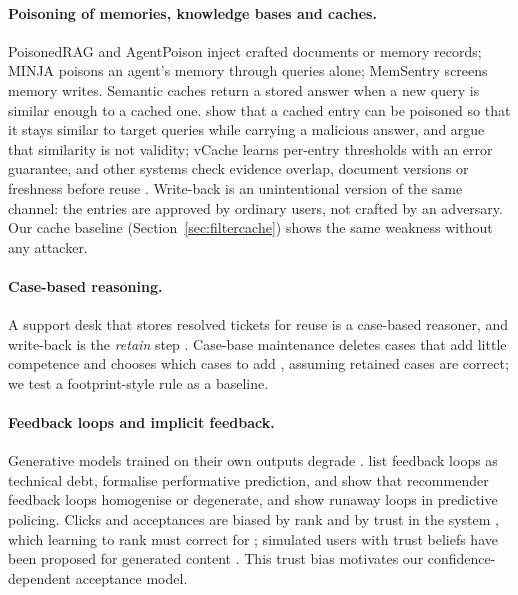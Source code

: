\documentclass[11pt]{article}
\begin{document}
\paragraph{Poisoning of memories, knowledge bases and caches.} PoisonedRAG \citep{zou2025poisonedrag} and AgentPoison \citep{chen2024agentpoison} inject crafted documents or memory records; MINJA \citep{dong2025minja} poisons an agent's memory through queries alone; MemSentry \citep{memsentry2026} screens memory writes. Semantic caches \citep{gptcache} return a stored answer when a new query is similar enough to a cached one. \citet{simvalidity2026} show that a cached entry can be poisoned so that it stays similar to target queries while carrying a malicious answer, and argue that similarity is not validity; vCache \citep{schroeder2025vcache} learns per-entry thresholds with an error guarantee, and other systems check evidence overlap, document versions or freshness before reuse \citep{shah2026grounded,fincacheserve2026,freshcache2026}. Write-back is an unintentional version of the same channel: the entries are approved by ordinary users, not crafted by an adversary. Our cache baseline (Section~\ref{sec:filtercache}) shows the same weakness without any attacker.

\paragraph{Case-based reasoning.} A support desk that stores resolved tickets for reuse is a case-based reasoner, and write-back is the \emph{retain} step \citep{aamodt1994cbr}. Case-base maintenance deletes cases that add little competence \citep{smyth1995forget} and chooses which cases to add \citep{zhu1999add}, assuming retained cases are correct; we test a footprint-style rule as a baseline.

\paragraph{Feedback loops and implicit feedback.} Generative models trained on their own outputs degrade \citep{shumailov2024collapse,alemohammad2024mad}. \citet{sculley2015debt} list feedback loops as technical debt, \citet{perdomo2020performative} formalise performative prediction, \citet{chaney2018confounding} and \citet{jiang2019degenerate} show that recommender feedback loops homogenise or degenerate, and \citet{ensign2018runaway} show runaway loops in predictive policing. Clicks and acceptances are biased by rank and by trust in the system \citep{joachims2005accurately,joachims2007evaluating}, which learning to rank must correct for \citep{joachims2017unbiased}; simulated users with trust beliefs have been proposed for generated content \citep{pauser2026}. This trust bias motivates our confidence-dependent acceptance model.
\end{document}
